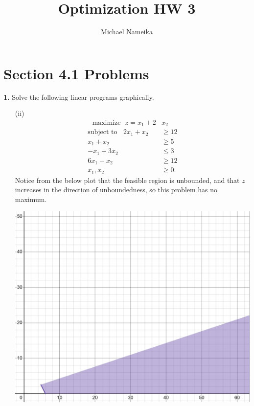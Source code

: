 \documentclass{article}
\title{Optimization HW 3}
\author{Michael Nameika}
\date{}
\begin{document}
\maketitle

\section*{Section 4.1 Problems}
\textbf{1.} Solve the following linear programs graphically.
\begin{itemize} 
    \item[(ii)] 
    \begin{align*}
       \:\:\: \text{maximize} \:\:\: z = x_1 + 2&x_2 \\
        \text{subject to} \:\:\:\: 2x_1 + x_2 &\geq 12\\
        x_1 + x_2 &\geq 5 \\
        -x_1 + 3x_2 &\leq 3\\
        6x_1 - x_2 &\geq 12\\
        x_1,x_2 &\geq 0.
    \end{align*}
    Notice from the below plot that the feasible region is unbounded, and that $z$ increases in the direction of unboundedness, so this problem has no maximum.
    \begin{center}
        \includegraphics[scale = 0.8]{region1}
    \end{center}


\end{itemize}
\end{document}
